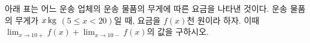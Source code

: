 아래 표는 어느 운송 업체의 운송 물품의 무게에 따른 요금을 나타낸 것이다. 운송 물품의 무게가 $x\mkern3mu \mathrm{kg}$ $(5\le x<20)$일 때, 요금을 $f(x)$천 원이라 하자. 이때 $\displaystyle\lim_{x\to 10+} f(x)+\lim_{x\to 10-} f(x)$의 값을 구하시오.
\par\smallskip\begin{center}\resizebox{\ifdim\width>\linewidth\linewidth\else\width\fi}{!}{}\end{center}
